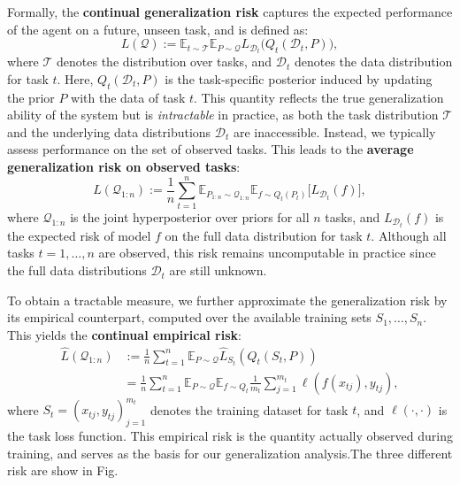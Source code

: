 \documentclass[letterpaper]{article} %
\begin{document}
Formally, the \textbf{continual generalization risk} captures the expected performance of the agent on a future, unseen task, and is defined as:
\begin{equation}
L(\mathcal{Q}) := \mathbb{E}_{t \sim \mathcal{T}}\mathbb{E}_{P \sim \mathcal{Q}}L_{\mathcal{D}_t}\big(Q_t(\mathcal{D}_t, P)\big),
\end{equation}
where $\mathcal{T}$ denotes the distribution over tasks, and $\mathcal{D}_t$ denotes the data distribution for task $t$. Here, $Q_t(\mathcal{D}_t, P)$ is the task-specific posterior induced by updating the prior $P$ with the data of task $t$. This quantity reflects the true generalization ability of the system but is \emph{intractable} in practice, as both the task distribution $\mathcal{T}$ and the underlying data distributions $\mathcal{D}_t$ are inaccessible. 
Instead, we typically assess performance on the set of observed tasks. This leads to the \textbf{average generalization risk on observed tasks}:
\begin{equation}
L(\mathcal{Q}_{1:n}) :=
\frac{1}{n} \sum_{t=1}^n
\mathbb{E}_{P_{1:n} \sim \mathcal{Q}_{1:n}}
\mathbb{E}_{f \sim Q_t(P_t)}
\big[
L_{\mathcal{D}_t}(f)
\big],
\end{equation}
where $\mathcal{Q}_{1:n}$ is the joint hyperposterior over priors for all $n$ tasks, and $L_{\mathcal{D}_t}(f)$ is the expected risk of model $f$ on the full data distribution for task $t$. Although all tasks $t=1,\dots,n$ are observed, this risk remains uncomputable in practice since the full data distributions $\mathcal{D}_t$ are still unknown.


To obtain a tractable measure, we further approximate the generalization risk by its empirical counterpart, computed over the available training sets $S_1,\dots,S_n$. This yields the \textbf{continual empirical risk}:
\begin{equation}
\begin{aligned}
\hat{L}(\mathcal{Q}_{1:n}) 
&:= \frac{1}{n} \sum_{t=1}^n \mathbb{E}_{P \sim \mathcal{Q}} \hat{L}_{S_t}(Q_t(S_t, P)) \\
&= \frac{1}{n} \sum_{t=1}^n \mathbb{E}_{P \sim \mathcal{Q}} \mathbb{E}_{f\sim Q_t} \frac{1}{m_t} \sum_{j=1}^{m_t} \ell(f(x_{tj}), y_{tj}),
\end{aligned}
\end{equation}
where $S_t = {(x_{tj}, y_{tj})}_{j=1}^{m_t}$ denotes the training dataset for task $t$, and $\ell(\cdot,\cdot)$ is the task loss function. This empirical risk is the quantity actually observed during training, and serves as the basis for our generalization analysis.The three different risk are show in Fig.
\end{document}
